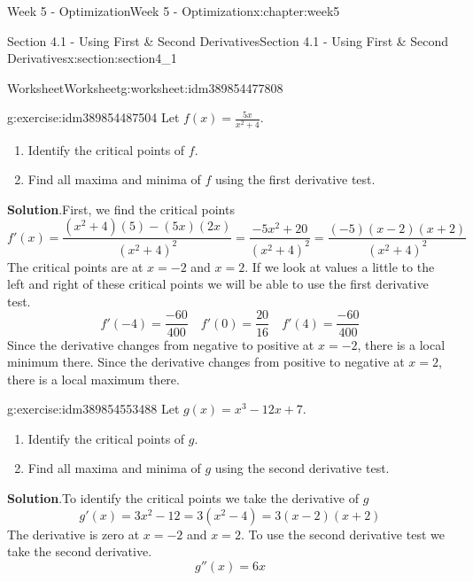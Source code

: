 \documentclass[oneside,10pt,]{book}
\newcommand{\blocktitlefont}{\relax}
\numberwithin{equation}{section}
\begin{document}
\begin{chapterptx}{Week 5 - Optimization}{}{Week 5 - Optimization}{}{}{x:chapter:week5}
\begin{sectionptx}{Section 4.1 - Using First \& Second Derivatives}{}{Section 4.1 - Using First \& Second Derivatives}{}{}{x:section:section4_1}
\begin{worksheet-subsection}{Worksheet}{}{Worksheet}{}{}{g:worksheet:idm389854477808}
\begin{divisionexercise}{1}{}{}{g:exercise:idm389854487504}%
Let \(\displaystyle f(x) = \frac{5x}{x^2+4}\).%
%
\begin{enumerate}[label=(\alph*)]
\item{}Identify the critical points of \(f\).%
\item{}Find all maxima and minima of \(f\) using the first derivative test.%
\end{enumerate}
\textbf{\blocktitlefont Solution}.\hypertarget{g:solution:idm389854487888}{}\quad{}First, we find the critical points%
\begin{equation*}
f'(x) = \frac{(x^2+4)(5)-(5x)(2x)}{(x^2+4)^2} = \frac{-5x^2+20}{(x^2+4)^2} = \frac{(-5)(x-2)(x+2)}{(x^2+4)^2} 
\end{equation*}
The critical points are at \(x=-2\) and \(x=2\). If we look at values a little to the left and right of these critical points we will be able to use the first derivative test.%
\begin{equation*}
f'(-4) = \frac{-60}{400}\quad f'(0)=\frac{20}{16} \quad f'(4) = \frac{-60}{400} 
\end{equation*}
Since the derivative changes from negative to positive at \(x=-2\), there is a local minimum there. Since the derivative changes from positive to negative at \(x=2\), there is a local maximum there.%
\end{divisionexercise}%
\begin{divisionexercise}{2}{}{}{g:exercise:idm389854553488}%
Let \(g(x) = x^3 - 12x + 7\).%
%
\begin{enumerate}[label=(\alph*)]
\item{}Identify the critical points of \(g\).%
\item{}Find all maxima and minima of \(g\) using the second derivative test.%
\end{enumerate}
\textbf{\blocktitlefont Solution}.\hypertarget{g:solution:idm389854555104}{}\quad{}To identify the critical points we take the derivative of \(g\)%
\begin{equation*}
g'(x) = 3x^2-12 = 3(x^2-4)=3(x-2)(x+2)
\end{equation*}
The derivative is zero at \(x=-2\) and \(x=2\). To use the second derivative test we take the second derivative.%
\begin{equation*}
g''(x) = 6x
\end{equation*}

\end{divisionexercise}
\end{worksheet-subsection}
\end{sectionptx}
\end{chapterptx}
\end{document}
